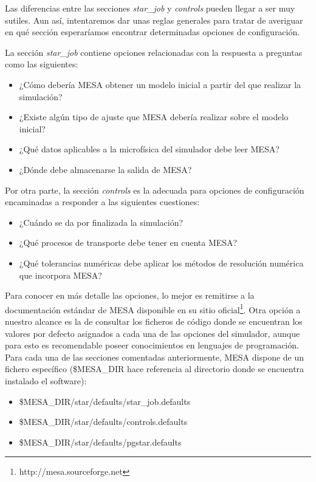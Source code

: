 Las diferencias entre las secciones \textit{star\_job} y \textit{controls} pueden llegar a ser muy sutiles. Aun así, intentaremos dar unas reglas generales para tratar de averiguar en qué sección esperaríamos encontrar determinadas opciones de configuración.\par

La sección \textit{star\_job} contiene opciones relacionadas con la respuesta a preguntas como las siguientes:
\begin{itemize}
    \item ¿Cómo debería MESA obtener un modelo inicial a partir del que realizar la simulación?
    \item ¿Existe algún tipo de ajuste que MESA debería realizar sobre el modelo inicial?
    \item ¿Qué datos aplicables a la microfísica del simulador debe leer MESA?
    \item ¿Dónde debe almacenarse la salida de MESA?
\end{itemize}

Por otra parte, la sección \textit{controls} es la adecuada para opciones de configuración encaminadas a responder a las siguientes cuestiones:
\begin{itemize}
    \item ¿Cuándo se da por finalizada la simulación?
    \item ¿Qué procesos de transporte debe tener en cuenta MESA?
    \item ¿Qué tolerancias numéricas debe aplicar los métodos de resolución numérica que incorpora MESA?
\end{itemize}

Para conocer en más detalle las opciones, lo mejor es remitirse a la documentación estándar de MESA disponible en su sitio oficial\footnote{http://mesa.sourceforge.net}. Otra opción a nuestro alcance es la de consultar los ficheros de código donde se encuentran los valores por defecto asignados a cada una de las opciones del simulador, aunque para esto es recomendable poseer conocimientos en lenguajes de programación. Para cada una de las secciones comentadas anteriormente, MESA dispone de un fichero específico (\$MESA\_DIR hace referencia al directorio donde se encuentra instalado el software):

\begin{itemize}
    \item \$MESA\_DIR/star/defaults/star\_job.defaults
    \item \$MESA\_DIR/star/defaults/controls.defaults
    \item \$MESA\_DIR/star/defaults/pgstar.defaults
\end{itemize}

